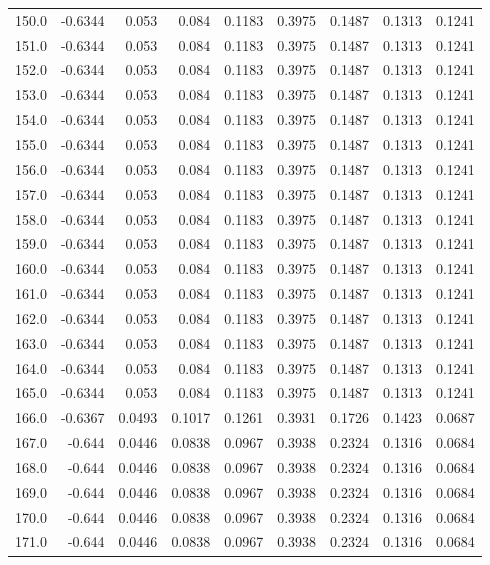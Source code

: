 \begin{longtable}{lrrrrrrrr}
150.0 & -0.6344 & 0.053 & 0.084 & 0.1183 & 0.3975 & 0.1487 & 0.1313 & 0.1241 \\
151.0 & -0.6344 & 0.053 & 0.084 & 0.1183 & 0.3975 & 0.1487 & 0.1313 & 0.1241 \\
152.0 & -0.6344 & 0.053 & 0.084 & 0.1183 & 0.3975 & 0.1487 & 0.1313 & 0.1241 \\
153.0 & -0.6344 & 0.053 & 0.084 & 0.1183 & 0.3975 & 0.1487 & 0.1313 & 0.1241 \\
154.0 & -0.6344 & 0.053 & 0.084 & 0.1183 & 0.3975 & 0.1487 & 0.1313 & 0.1241 \\
155.0 & -0.6344 & 0.053 & 0.084 & 0.1183 & 0.3975 & 0.1487 & 0.1313 & 0.1241 \\
156.0 & -0.6344 & 0.053 & 0.084 & 0.1183 & 0.3975 & 0.1487 & 0.1313 & 0.1241 \\
157.0 & -0.6344 & 0.053 & 0.084 & 0.1183 & 0.3975 & 0.1487 & 0.1313 & 0.1241 \\
158.0 & -0.6344 & 0.053 & 0.084 & 0.1183 & 0.3975 & 0.1487 & 0.1313 & 0.1241 \\
159.0 & -0.6344 & 0.053 & 0.084 & 0.1183 & 0.3975 & 0.1487 & 0.1313 & 0.1241 \\
160.0 & -0.6344 & 0.053 & 0.084 & 0.1183 & 0.3975 & 0.1487 & 0.1313 & 0.1241 \\
161.0 & -0.6344 & 0.053 & 0.084 & 0.1183 & 0.3975 & 0.1487 & 0.1313 & 0.1241 \\
162.0 & -0.6344 & 0.053 & 0.084 & 0.1183 & 0.3975 & 0.1487 & 0.1313 & 0.1241 \\
163.0 & -0.6344 & 0.053 & 0.084 & 0.1183 & 0.3975 & 0.1487 & 0.1313 & 0.1241 \\
164.0 & -0.6344 & 0.053 & 0.084 & 0.1183 & 0.3975 & 0.1487 & 0.1313 & 0.1241 \\
165.0 & -0.6344 & 0.053 & 0.084 & 0.1183 & 0.3975 & 0.1487 & 0.1313 & 0.1241 \\
166.0 & -0.6367 & 0.0493 & 0.1017 & 0.1261 & 0.3931 & 0.1726 & 0.1423 & 0.0687 \\
167.0 & -0.644 & 0.0446 & 0.0838 & 0.0967 & 0.3938 & 0.2324 & 0.1316 & 0.0684 \\
168.0 & -0.644 & 0.0446 & 0.0838 & 0.0967 & 0.3938 & 0.2324 & 0.1316 & 0.0684 \\
169.0 & -0.644 & 0.0446 & 0.0838 & 0.0967 & 0.3938 & 0.2324 & 0.1316 & 0.0684 \\
170.0 & -0.644 & 0.0446 & 0.0838 & 0.0967 & 0.3938 & 0.2324 & 0.1316 & 0.0684 \\
171.0 & -0.644 & 0.0446 & 0.0838 & 0.0967 & 0.3938 & 0.2324 & 0.1316 & 0.0684 \\

\end{longtable}
